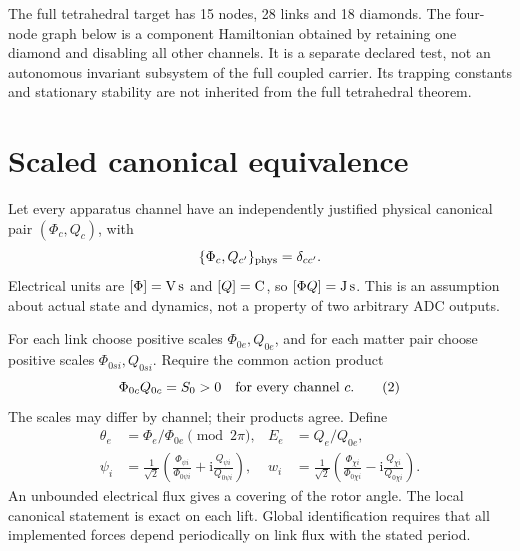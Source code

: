 \documentclass[10pt,a4paper]{article}
\newcommand{\ii}{\mathrm i}
\begin{document}
The full tetrahedral target has 15 nodes, 28 links and 18 diamonds. The four-node graph below is a component Hamiltonian obtained by retaining one diamond and disabling all other channels. It is a separate declared test, not an autonomous invariant subsystem of the full coupled carrier. Its trapping constants and stationary stability are not inherited from the full tetrahedral theorem.

\newpage
\section{Scaled canonical equivalence}
Let every apparatus channel have an independently justified physical canonical pair $(\Phi_c,Q_c)$, with
\[
\{\Phi_c,Q_{c'}\}_{\rm phys}=\delta_{cc'}.
\]
Electrical units are $[\Phi]={\rm V\,s}$ and $[Q]={\rm C}$, so $[\Phi Q]={\rm J\,s}$. This is an assumption about actual state and dynamics, not a property of two arbitrary ADC outputs.

For each link choose positive scales $\Phi_{0e},Q_{0e}$, and for each matter pair choose positive scales $\Phi_{0si},Q_{0si}$. Require the common action product
\[
\Phi_{0c}Q_{0c}=S_0>0\quad\hbox{for every channel }c.
\tag{2}
\]
The scales may differ by channel; their products agree. Define
\begin{equation}\begin{aligned}
\theta_e&=\Phi_e/\Phi_{0e}\pmod{2\pi},& E_e&=Q_e/Q_{0e},\\
\psi_i&=\frac1{\sqrt2}\left(\frac{\Phi_{\psi i}}{\Phi_{0\psi i}}+\ii\frac{Q_{\psi i}}{Q_{0\psi i}}\right),&
w_i&=\frac1{\sqrt2}\left(\frac{\Phi_{\chi i}}{\Phi_{0\chi i}}-\ii\frac{Q_{\chi i}}{Q_{0\chi i}}\right).
\end{aligned}\tag{3}\end{equation}
An unbounded electrical flux gives a covering of the rotor angle. The local canonical statement is exact on each lift. Global identification requires that all implemented forces depend periodically on link flux with the stated period.
\end{document}
